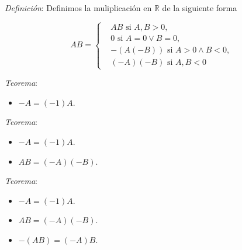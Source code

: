 \documentclass{beamer}
\begin{document}
  \begin{frame}
    \textit{Definición}: Definimos la muliplicación en $\mathbb{R}$ de la siguiente forma

    \begin{equation*}
      AB = \left\{
      \begin{aligned}
        &AB \text{ si } A, B > 0, \\
        &0 \text{ si } A = 0 \lor B = 0, \\
        &-(A(-B)) \text{ si } A > 0 \land B < 0, \\
        &(-A)(-B) \text{ si } A, B < 0
      \end{aligned}
      \right.
    \end{equation*}
  \end{frame}

  \begin{frame}
    \textit{Teorema}: 

    \begin{itemize}
      \item $-A = (-1)A$. 
    \end{itemize}
  \end{frame}

  \begin{frame}
    \textit{Teorema}: 

    \begin{itemize}
      \item $-A = (-1)A$. 
      \item $AB = (-A)(-B)$.
    \end{itemize}
  \end{frame}

  \begin{frame}
    \textit{Teorema}: 

    \begin{itemize}
      \item $-A = (-1)A$. 
      \item $AB = (-A)(-B)$.
      \item $-(AB) = (-A)B$.
    \end{itemize}
  \end{frame}
\end{document}
